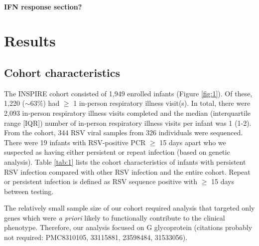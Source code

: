 \documentclass{article}
\begin{document}
\paragraph{IFN response section?}

\section{Results}
\subsection{Cohort characteristics}
The INSPIRE cohort consisted of 1,949 enrolled infants 
(Figure \ref{fig:1}).
Of these, 1,220 ($\sim 63\%$) had $\ge$ 1 in-person respiratory illness visit(s). 
In total, there were 2,093 in-person respiratory illness visits completed and the median (interquartile range [IQR]) number of in-person respiratory illness visits per infant was 1 (1-2). 
From the cohort, 344 RSV viral samples from 326 individuals were sequenced.
There were 19 infants with RSV-positive PCR $\ge$ 15 days apart who we suspected as having either persistent or repeat infection (based on genetic analysis).
Table \ref{tab:1} lists the cohort characteristics of infants with persistent RSV infection compared with other RSV infection and the entire cohort. 
Repeat or persistent infection is defined as RSV sequence positive with $\ge$ 15 days between testing.

The relatively small sample size of our cohort required analysis that targeted only genes which were \textit{a priori} likely to functionally contribute to the clinical phenotype. 
Therefore, our analysis focused on G glycoprotein (citations probably not required: PMC8310105, 33115881, 23598484, 31533056).
\end{document}
